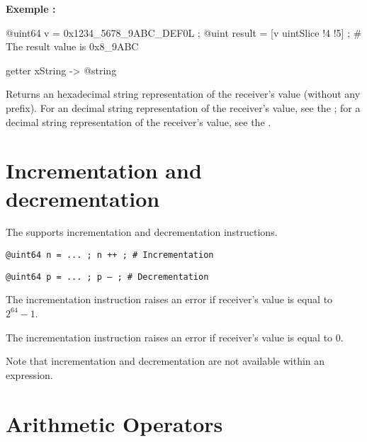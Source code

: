\textbf{Exemple :}
\begin{galgascode}
@uint64 v = 0x1234_5678_9ABC_DEF0L ;
@uint result = [v uintSlice !4 !5] ; # The result value is 0x8_9ABC
\end{galgascode}






\begin{galgascode}
getter xString -> @string
\end{galgascode}

Returns an hexadecimal string representation of the receiver's value (without any prefix). For an decimal string representation of the receiver's value, see the ; for a decimal string representation of the receiver's value, see the .






\section{Incrementation and decrementation}

The  supports incrementation and decrementation instructions.

\texttt{@uint64 n = ... ; n ++ ; \# Incrementation}

\texttt{@uint64 p = ... ; p -- ; \# Decrementation}\newline

The incrementation instruction raises an error if receiver's value is equal to $2^{64}-1$.\newline

The incrementation instruction raises an error if receiver's value is equal to 0.\newline

Note that incrementation and decrementation are not available within an expression.




\section{Arithmetic Operators}

